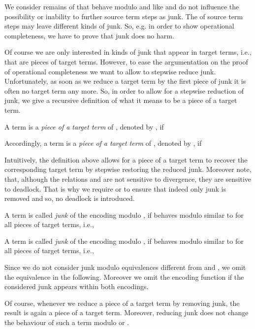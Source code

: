 \documentclass[]{llncs}
\begin{document}
We consider remains of \simulations that behave modulo  and  like  and do not influence the possibility or inability to \simulate further source term steps as junk. The \simulation of source term steps may leave different kinds of junk. So, e.g. in order to show operational completeness, we have to prove that junk does no harm.

Of course we are only interested in kinds of junk that appear in target terms, i.e., that are pieces of target terms. However, to ease the argumentation on the proof of operational completeness we want to allow to stepwise reduce junk. Unfortunately, as soon as we reduce a target term by the first piece of junk it is often no target term any more. So, in order to allow for a stepwise reduction of junk, we give a recursive definition of what it means to be a piece of a target term.

\begin{definition} \label{def:pieceTargetTerm}
	A term  is a \emph{piece of a target term} of , denoted by , if
	
	Accordingly, a term  is a \emph{piece of a target term} of , denoted by , if
	
\end{definition}
\noindent
Intuitively, the definition above allows for a piece of a target term to recover the corresponding target term by stepwise restoring the reduced junk. Moreover note, that, although the relations  and  are not sensitive to divergence, they are sensitive to deadlock. That is why we require  or  to ensure that indeed only junk is removed and so, no deadlock is introduced.

\begin{definition}[Junk] \label{def:junk}
	A term  is called \emph{junk} of the encoding  modulo , if  behaves modulo  similar to  for all pieces of target terms, i.e.,
	
	A term  is called \emph{junk} of the encoding  modulo , if  behaves modulo  similar to  for all pieces of target terms, i.e.,
	
\end{definition}
\noindent
Since we do not consider junk modulo equivalences different from  and , we omit the equivalence in the following. Moreover we omit the encoding function if the considered junk appears within both encodings.

Of course, whenever we reduce a piece of a target term by removing junk, the result is again a piece of a target term. Moreover, reducing junk does not change the behaviour of such a term modulo  or .
\end{document}
